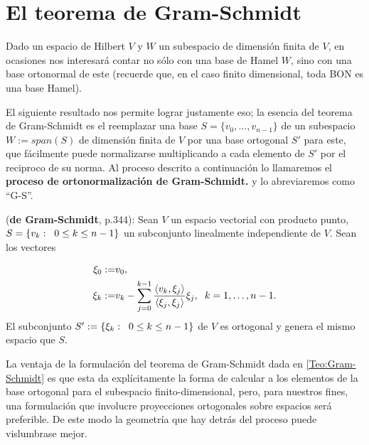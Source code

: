 \section{El teorema de Gram-Schmidt}
Dado un espacio de Hilbert $V$
y $W$ un subespacio de dimensión finita de $V$,
en ocasiones nos interesará contar no sólo con una
base de Hamel $W$, sino con una base ortonormal de este
(recuerde que, en el caso finito dimensional, toda
BON es una base Hamel).
 
El siguiente resultado nos permite lograr justamente eso;
la esencia del teorema de Gram-Schmidt es el reemplazar una base
$S=\{ v_{0}, \ldots ,v_{n-1} \}$ de un subespacio 
$W := span(S)$ de dimensión finita de $V$ 
por una base ortogonal $S'$ para este, que
fácilmente puede normalizarse multiplicando a cada elemento 
de $S'$ por el reciproco de su norma.
Al proceso descrito a continuación lo llamaremos
el \textbf{proceso de ortonormalización de Gram-Schmidt.}
y lo abreviaremos como ``G-S''.\\

\begin{teo} \label{Teo:Gram-Schmidt}
(\textbf{de Gram-Schmidt}, \cite{friedberg} p.344): 
Sean $V$ un espacio vectorial
con producto punto, $S=\{ v_{k} : \hspace{0.2cm} 0 \leq k \leq n-1 \}$ un
subconjunto linealmente independiente de $V$. 
Sean los vectores

\[
\begin{split}
\xi_{0}:= & v_{0}, \\
\xi_{k} := & v_{k} - \sum\limits_{j=0}^{k-1}
\frac{\langle v_{k} , \xi_{j} \rangle}{
\langle \xi_{j} , \xi_{j} \rangle}  \xi_{j},
\hspace{0.2cm} k=1, \ldots ,n-1.
\end{split}
\]
\noindent
El subconjunto 
$S':=\{ \xi_{k} : \hspace{0.2cm} 0 \leq k \leq n-1  \}$ de $V$
es ortogonal y genera 
el mismo espacio que $S$.
\end{teo}


La ventaja de la formulación del teorema
de Gram-Schmidt dada en \ref{Teo:Gram-Schmidt}
es que esta
da explícitamente la forma de calcular a los
elementos de la base ortogonal para el subespacio
finito-dimensional, pero,
para nuestros fines, una formulación que
involucre proyecciones ortogonales sobre espacios
será preferible. De este modo la geometría
que hay detrás del proceso puede
vislumbrase mejor. 


